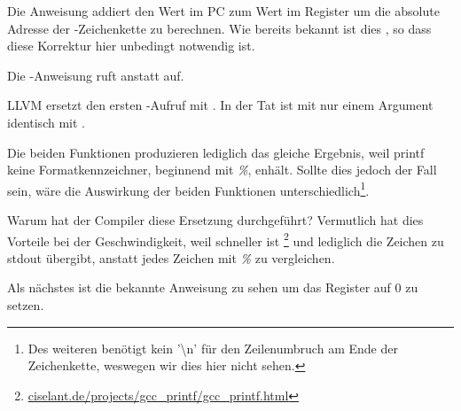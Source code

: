 
Die Anweisung  addiert den Wert im \ac{PC} zum Wert im Register 
um die absolute Adresse der -Zeichenkette zu berechnen.
Wie bereits bekannt ist dies \q{\PICcode}, so dass diese Korrektur hier unbedingt notwendig ist.

Die -Anweisung ruft \puts anstatt \printf auf.

\label{puts}

LLVM ersetzt den ersten \printf-Aufruf mit \puts. In der Tat ist \printf mit nur einem
Argument identisch mit \puts.

Die beiden Funktionen produzieren lediglich das gleiche Ergebnis, weil printf keine
Formatkennzeichner, beginnend mit \emph{\%}, enhält.
Sollte dies jedoch der Fall sein, wäre die Auswirkung der beiden Funktionen
unterschiedlich\footnote{Des weiteren benötigt \puts kein '\textbackslash{}n'
für den Zeilenumbruch am Ende der Zeichenkette, weswegen wir dies hier nicht sehen.}.

Warum hat der Compiler diese Ersetzung durchgeführt? Vermutlich hat dies Vorteile bei
der Geschwindigkeit, weil \puts schneller ist
\footnote{\href{http://www.ciselant.de/projects/gcc_printf/gcc_printf.html}{ciselant.de/projects/gcc\_printf/gcc\_printf.html}}
und lediglich die Zeichen zu \gls{stdout} übergibt, anstatt jedes Zeichen mit \emph{\%} zu vergleichen.

Als nächstes ist die bekannte Anweisung  zu sehen um das Register  auf 0 zu setzen.
